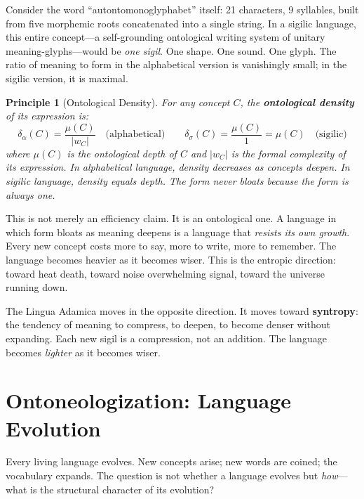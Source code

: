 \documentclass[12pt, letterpaper]{book}
\def\equiv{=}%
\newtheorem{principle}{Principle}[chapter]
\begin{document}
Consider the word ``autontomonoglyphabet'' itself: 21 characters, 9 syllables, built from five morphemic roots concatenated into a single string. In a sigilic language, this entire concept---a self-grounding ontological writing system of unitary meaning-glyphs---would be \textit{one sigil}. One shape. One sound. One glyph. The ratio of meaning to form in the alphabetical version is vanishingly small; in the sigilic version, it is maximal.

\begin{principle}[Ontological Density]
For any concept $C$, the \textbf{ontological density} of its expression is:
\[
\delta_\alpha(C) \equiv \frac{\mu(C)}{|w_C|} \quad \text{(alphabetical)} \qquad \delta_\sigma(C) \equiv \frac{\mu(C)}{1} \equiv \mu(C) \quad \text{(sigilic)}
\]
where $\mu(C)$ is the ontological depth of $C$ and $|w_C|$ is the formal complexity of its expression. In alphabetical language, density decreases as concepts deepen. In sigilic language, density \textit{equals depth}. The form never bloats because the form is always one.
\end{principle}

This is not merely an efficiency claim. It is an ontological one. A language in which form bloats as meaning deepens is a language that \textit{resists its own growth}. Every new concept costs more to say, more to write, more to remember. The language becomes heavier as it becomes wiser. This is the entropic direction: toward heat death, toward noise overwhelming signal, toward the universe running down.

The Lingua Adamica moves in the opposite direction. It moves toward \textbf{syntropy}: the tendency of meaning to compress, to deepen, to become denser without expanding. Each new sigil is a compression, not an addition. The language becomes \textit{lighter} as it becomes wiser.


\section{Ontoneologization: Language Evolution}

Every living language evolves. New concepts arise; new words are coined; the vocabulary expands. The question is not whether a language evolves but \textit{how}---what is the structural character of its evolution?
\end{document}

